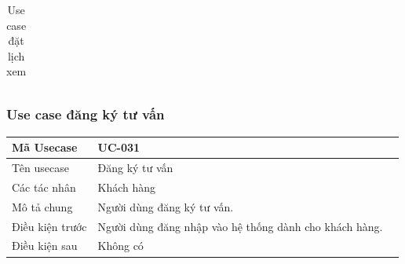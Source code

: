 \documentclass[12pt,a4paper]{article}
\begin{document}
\begin{table}[H]
\begin{tabular}{|p{3.5cm}|p{11.5cm}|c|}
            \\ \hline
        \end{tabular}
        \caption{Use case đặt lịch xem}

    \end{table}


    \subsubsection*{Use case đăng ký tư vấn}
    \begin{table}[H]
        \centering
        \begin{tabular}{|p{3.5cm}|p{11.5cm}|c|}
            \hline
            Mã Usecase      & UC-031                                                 \\
            \hline
            Tên usecase     & Đăng ký tư vấn                                         \\
            \hline
            Các tác nhân    & Khách hàng                                             \\
            \hline
            Mô tả chung     & Người dùng đăng ký tư vấn.                             \\
            \hline

            Điều kiện trước & Người dùng đăng nhập vào hệ thống dành cho khách hàng. \\
            \hline

            Điều kiện sau   & Không có                                               \\
            \hline


\end{tabular}
\end{table}
\end{document}
